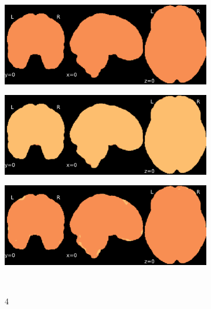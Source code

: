 \documentclass{article}
\begin{document}
\begin{landscape}
\begin{figure}
\begin{subfigure}[t]{0.2\paperheight}
        \end{subfigure}
        \begin{subfigure}[t]{0.2\paperheight}
            \centering
            \includegraphics[width=\textwidth]{figures/sig/fwhm_5/rr_ds000256_sub-CTS201_sig.pdf}
        \end{subfigure}
        \begin{subfigure}[t]{0.2\paperheight}
            \centering
            \includegraphics[width=\textwidth]{figures/sig/fwhm_5/rs_ds000256_sub-CTS201_sig.pdf}
        \end{subfigure}
        \begin{subfigure}[t]{0.2\paperheight}
            \centering
            \includegraphics[width=\textwidth]{figures/sig/fwhm_5/rr.rs_ds000256_sub-CTS201_sig.pdf}
        \end{subfigure} \\
        \begin{subfigure}[b][][c]{0.01\paperwidth} 4 \vspace*{15pt} \end{subfigure}

\end{figure}
\end{landscape}
\end{document}

